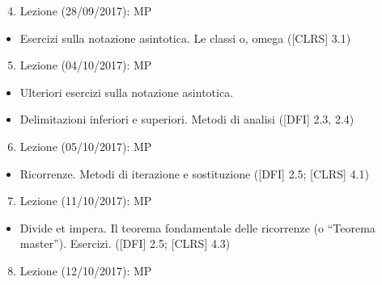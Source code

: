 \documentclass{article}
\providecommand{\tightlist}{%
  \setlength{\itemsep}{0pt}\setlength{\parskip}{0pt}}
\begin{document}
\begin{enumerate}
\setcounter{enumi}{3}
\tightlist
\item
  {Lezione (28/09/2017): MP}
\end{enumerate}

\begin{itemize}
\tightlist
\item
  {Esercizi sulla notazione asintotica. Le classi o, omega ({[}CLRS{]}
  3.1)}
\end{itemize}

\begin{enumerate}
\setcounter{enumi}{4}
\tightlist
\item
  {Lezione (04/10/2017): MP}
\end{enumerate}

\begin{itemize}
\tightlist
\item
  {Ulteriori esercizi sulla notazione asintotica.}
\item
  {Delimitazioni inferiori e superiori. Metodi di analisi ({[}DFI{]}
  2.3, 2.4)}
\end{itemize}

\begin{enumerate}
\setcounter{enumi}{5}
\tightlist
\item
  {Lezione (05/10/2017): MP}
\end{enumerate}

\begin{itemize}
\tightlist
\item
  {Ricorrenze. Metodi di iterazione e sostituzione ({[}DFI{]} 2.5;
  {[}CLRS{]} 4.1)}
\end{itemize}

\begin{enumerate}
\setcounter{enumi}{6}
\tightlist
\item
  {Lezione (11/10/2017): MP}
\end{enumerate}

\begin{itemize}
\tightlist
\item
  {Divide et impera. Il teorema fondamentale delle ricorrenze (o
  ``Teorema master''). Esercizi. ({[}DFI{]} 2.5; {[}CLRS{]} 4.3)}
\end{itemize}

\begin{enumerate}
\setcounter{enumi}{7}
\tightlist
\item
  {Lezione (12/10/2017): MP}
\end{enumerate}
\end{document}

